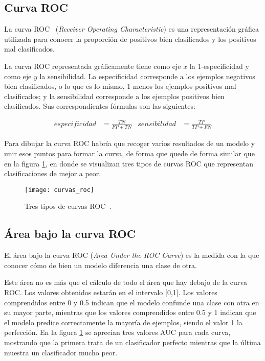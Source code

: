 \subsection{Curva ROC}
La curva ROC~\cite{wiki:roc} (\textit{Receiver Operating Characteristic}) es una representación gráfica utilizada para conocer la proporción de positivos bien clasificados y los positivos mal clasificados.

La curva ROC representada gráficamente tiene como eje $x$ la 1-especificidad y como eje $y$ la sensibilidad. La especificidad corresponde a los ejemplos negativos bien clasificados, o lo que es lo mismo, 1 menos los ejemplos positivos mal clasificados; y la sensibilidad corresponde a los ejemplos positivos bien clasificados. Sus correspondientes fórmulas son las siguientes:

\begin{align}
	especificidad &= \frac{TN}{FP+TN} &
	sensibilidad &= \frac{TP}{TP+FN}
\end{align}

Para dibujar la curva ROC habría que recoger varios resultados de un modelo y unir esos puntos para formar la curva, de forma que quede de forma similar que en la figura \ref{fig:roc}, en donde se visualizan tres tipos de curvas ROC que representan clasificaciones de mejor a peor.

\begin{figure}[h]
	\texttt{[image: curvas\_roc]}
	\caption[Tres tipos de curvas ROC.]{Tres tipos de curvas ROC~\cite{wiki:roc}.}
	\label{fig:roc}
\end{figure}

\subsection{Área bajo la curva ROC}
El área bajo la curva ROC (\textit{Area Under the ROC Curve}) es la medida con la que conocer cómo de bien un modelo diferencia una clase de otra.

Este área no es más que el cálculo de todo el área que hay debajo de la curva ROC. Los valores obtenidos estarán en el intervalo [0,1]. Los valores comprendidos entre 0 y 0.5 indican que el modelo confunde una clase con otra en su mayor parte, mientras que los valores comprendidos entre 0.5 y 1 indican que el modelo predice correctamente la mayoría de ejemplos, siendo el valor 1 la perfección. En la figura \ref{fig:roc} se aprecian tres valores AUC para cada curva, mostrando que la primera trata de un clasificador perfecto mientras que la última muestra un clasificador mucho peor.
